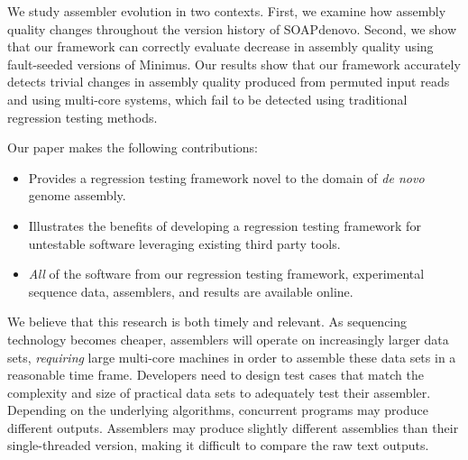 We study assembler evolution in two contexts. First,
we examine how assembly quality changes
throughout the version history of SOAPdenovo. Second,
we show that our framework can correctly evaluate decrease in assembly quality
using fault-seeded versions of Minimus.
Our results show that our framework accurately detects trivial
changes in assembly quality produced from permuted input reads and using
multi-core systems, which fail to be detected using traditional regression
testing methods.

Our paper makes the following contributions:

\begin{itemize}

\item
Provides a regression testing framework novel to the domain of \emph{de novo} genome assembly.

\item
Illustrates the benefits of developing a regression testing framework for untestable software leveraging existing third party tools.

\item
\emph{All} of the software from our regression testing framework, experimental sequence data, assemblers, and results are available online.

\end{itemize}

We believe that this research is both timely and relevant.  As sequencing
technology becomes cheaper, assemblers will operate on increasingly larger data
sets, \emph{requiring} large multi-core machines in order to assemble these
data sets in a reasonable time frame.  Developers need to design test cases
that match the complexity and size of practical data sets to adequately test
their assembler.  Depending on the underlying algorithms, concurrent programs
may produce different outputs.  Assemblers may produce slightly different
assemblies than their single-threaded version, making it difficult to compare
the raw text outputs.

